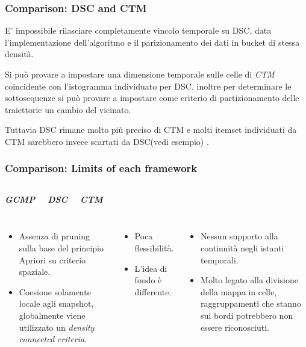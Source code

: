 \documentclass{beamer}
\begin{document}
\begin{frame}
	\frametitle{Comparison: DSC and CTM }
E' impossibile rilasciare completamente vincolo temporale su DSC, data l'implementazione dell'algoritmo e il parizionamento dei dati in bucket di stessa densità.

Si può provare a impostare una dimensione temporale sulle celle di \textit{CTM} coincidente con l'istogramma individuato per DSC, inoltre per determinare le sottosequenze si può provare a impostare come criterio di partizionamento delle traiettorie un cambio del vicinato.

Tuttavia DSC rimane molto più preciso di CTM e molti itemset individuati da CTM sarebbero invece scartati da DSC(vedi esempio) .
\end{frame}

\begin{frame}
	\frametitle{Comparison: Limits of each framework}
	\begin{columns}
		
		\begin{center}
			\textbf{\textit{\huge{GCMP}}}
			
		\end{center}
		
		\begin{center}
			\textbf{\textit{\huge{DSC}}}
			
		\end{center}
		
		\begin{center}
			\textbf{\textit{\huge{CTM}}}
			
		\end{center}
	\end{columns}
	\begin{columns}
		
		\column{.3\columnwidth}
		
\begin{itemize}
	\item Assenza di pruning sulla base del principio Apriori su criterio spaziale.
	\item Coesione solamente locale agli snapshot, globalmente viene utilizzato
	un \textit{density connected criteria}.
\end{itemize}
		
		
		\column{.3\textwidth}
\begin{itemize}
	\item Poca flessibilità.
	\item L'idea di fondo è differente.
\end{itemize}

		
		\column{.3\textwidth}
\begin{itemize}
	\item Nessun supporto alla continuità negli istanti temporali.
	\item Molto legato alla divisione della mappa in celle, raggruppamenti che stanno sui bordi potrebbero non essere riconosciuti.
\end{itemize}
	\end{columns}
\end{frame}     
\end{document}
